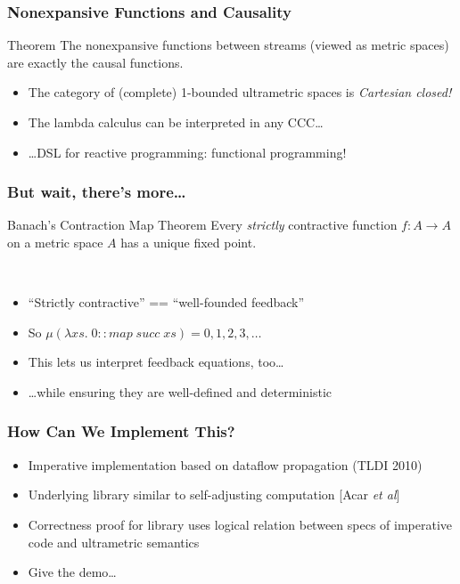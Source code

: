 \documentclass{beamer}
\begin{document}
\begin{frame}
  \frametitle{Nonexpansive Functions and Causality}

  \begin{block}{Theorem}
    The nonexpansive functions between streams (viewed as metric spaces) 
    are exactly the causal functions.
  \end{block}

  \pause 
  \begin{itemize}
    \item The category of (complete) 1-bounded ultrametric spaces is \emph{Cartesian closed!}
    \item The lambda calculus can be interpreted in any CCC\ldots
    \item \ldots DSL for reactive programming: functional programming!
  \end{itemize}
\end{frame}

\begin{frame}
  \frametitle{But wait, there's more\ldots}

  \begin{block}{Banach's Contraction Map Theorem}
    Every \emph{strictly} contractive function $f : A \to A$ on a metric space $A$ has a unique
    fixed point. 
  \end{block}
  \pause
  \ \\
  \begin{itemize}
    \item ``Strictly contractive'' == ``well-founded feedback''
    \item So $\mu(\lambda xs.\; 0 :: \mathit{map}\;\mathit{succ}\;xs) = 0, 1, 2, 3, \ldots$ \pause
    \item This lets us interpret feedback equations, too\ldots
    \item \ldots while ensuring they are well-defined and deterministic
  \end{itemize}
\end{frame}

\begin{frame}
  \frametitle{How Can We Implement This?}

  \begin{itemize}
    \item Imperative implementation based on dataflow propagation (TLDI 2010)
    \item Underlying library similar to self-adjusting computation [Acar \emph{et al}]
    \item Correctness proof for library uses logical relation between specs of imperative
      code and ultrametric semantics \pause
    \item Give the demo\ldots
  \end{itemize}
\end{frame}
\end{document}

